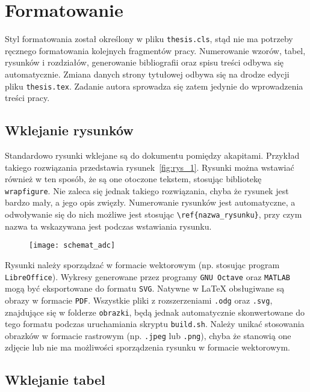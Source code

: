 \chapter{Formatowanie}

Styl formatowania został określony w pliku \verb|thesis.cls|, stąd nie ma potrzeby ręcznego formatowania kolejnych fragmentów pracy. Numerowanie wzorów, tabel, rysunków i rozdziałów, generowanie bibliografii oraz spisu treści odbywa się automatycznie. Zmiana danych strony tytułowej odbywa się na drodze edycji pliku \verb|thesis.tex|. Zadanie autora sprowadza się zatem jedynie do wprowadzenia treści pracy.

\section{Wklejanie rysunków}

Standardowo rysunki wklejane są do dokumentu pomiędzy akapitami. Przykład takiego rozwiązania przedstawia rysunek~\ref{fig:rys_1}. Rysunki można wstawiać również w ten sposób, że są one otoczone tekstem, stosując bibliotekę \verb|wrapfigure|. Nie zaleca się jednak takiego rozwiązania, chyba że rysunek jest bardzo mały, a jego opis zwięzły. Numerowanie rysunków jest automatyczne, a odwoływanie się do nich możliwe jest stosując \verb|\ref{nazwa_rysunku}|, przy czym nazwa ta wskazywana jest podczas wstawiania rysunku.

\begin{figure}[htb!]
\centering
\texttt{[image: schemat\_adc]}
\end{figure}

Rysunki należy sporządzać w formacie wektorowym (np. stosując program \verb|LibreOffice|). Wykresy generowane przez programy \verb|GNU Octave| oraz \verb|MATLAB| mogą być eksportowane do formatu \verb|SVG|. Natywne w \LaTeX{} obsługiwane są obrazy w formacie \verb|PDF|. Wszystkie pliki z rozszerzeniami \verb|.odg| oraz \verb|.svg|, znajdujące się w folderze \verb|obrazki|, będą jednak automatycznie skonwertowane do tego formatu podczas uruchamiania skryptu \verb|build.sh|. Należy unikać stosowania obrazków w formacie rastrowym (np. \verb|.jpeg| lub \verb|.png|), chyba że stanowią one zdjęcie lub nie ma możliwości sporządzenia rysunku w formacie wektorowym.

\section{Wklejanie tabel}

